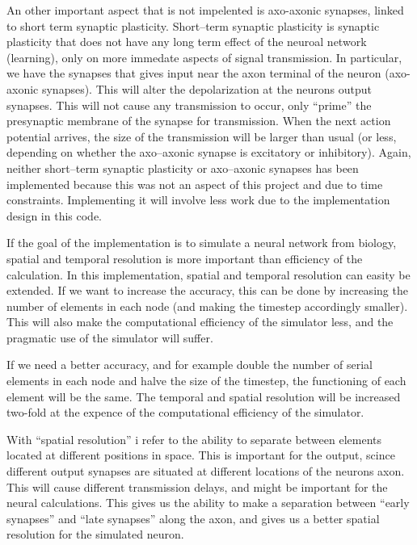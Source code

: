 An other important aspect that is not impelented is axo-axonic synapses, linked to short term synaptic plasticity.
Short--term synaptic plasticity is synaptic plasticity that does not have any long term effect of the neuroal network (learning), only on more immedate aspects of signal transmission.
In particular, we have the synapses that gives input near the axon terminal of the neuron (axo-axonic synapses). This will alter the depolarization at the neurons output synapses. %
This will not cause any transmission to occur, only ``prime'' the presynaptic membrane of the synapse for transmission.
When the next action potential arrives, the size of the transmission will be larger than usual (or less, depending on whether the axo--axonic synapse is excitatory or inhibitory).
Again, neither short--term synaptic plasticity or axo--axonic synapses has been implemented because this was not an aspect of this project and due to time constraints.
Implementing it will involve less work due to the implementation design in this code.

If the goal of the implementation is to simulate a neural network from biology, spatial and temporal resolution is more important than efficiency of the calculation.
In this implementation, spatial and temporal resolution can easity be extended.
If we want to increase the accuracy, this can be done by increasing the number of elements in each node (and making the timestep accordingly smaller).
This will also make the computational efficiency of the simulator less, and the pragmatic use of the simulator will suffer.

If we need a better accuracy, and for example double the number of serial elements in each node and halve the size of the timestep, the functioning of each element will be the same.
The temporal and spatial resolution will be increased two-fold at the expence of the computational efficiency of the simulator.

With ``spatial resolution'' i refer to the ability to separate between elements located at different positions in space.
This is important for the output, scince different output synapses are situated at different locations of the neurons axon.
This will cause different transmission delays, and might be important for the neural calculations.
This gives us the ability to make a separation between ``early synapses'' and ``late synapses'' along the axon, and gives us a better spatial resolution for the simulated neuron.

